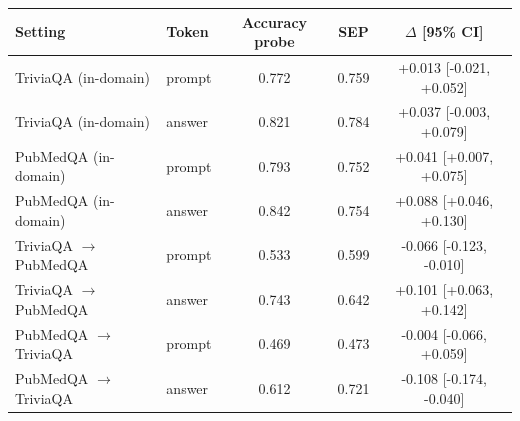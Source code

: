 \begin{tabular}{llccc}
\toprule
Setting & Token & Accuracy probe & SEP & $\Delta$ [95\% CI] \\
\midrule
TriviaQA (in-domain) & prompt & 0.772 & 0.759 & +0.013 [-0.021, +0.052] \\
TriviaQA (in-domain) & answer & 0.821 & 0.784 & +0.037 [-0.003, +0.079] \\
PubMedQA (in-domain) & prompt & 0.793 & 0.752 & +0.041 [+0.007, +0.075] \\
PubMedQA (in-domain) & answer & 0.842 & 0.754 & +0.088 [+0.046, +0.130] \\
TriviaQA $\to$ PubMedQA & prompt & 0.533 & 0.599 & -0.066 [-0.123, -0.010] \\
TriviaQA $\to$ PubMedQA & answer & 0.743 & 0.642 & +0.101 [+0.063, +0.142] \\
PubMedQA $\to$ TriviaQA & prompt & 0.469 & 0.473 & -0.004 [-0.066, +0.059] \\
PubMedQA $\to$ TriviaQA & answer & 0.612 & 0.721 & -0.108 [-0.174, -0.040] \\
\bottomrule
\end{tabular}
